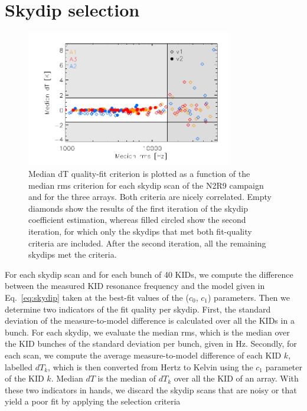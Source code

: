 \section{Skydip selection}%
\label{se:skydip-selection}

\begin{figure}[ht!]
\begin{center}
\includegraphics[clip=true,width=0.8\textwidth]{Figures/Opacity/plot_skydip_selection_two_crit.pdf}
\caption[N2R9 skydip scan selection.]{ Median dT quality-fit criterion is plotted as a function of the median rms criterion for each skydip scan of the N2R9 campaign and for the three arrays. Both criteria are nicely correlated. Empty diamonds show the results of the first iteration of the skydip coefficient estimation, whereas filled circled show the second iteration, for which only the skydips that met both fit-quality criteria are included. After the second iteration, all the remaining skydips met the criteria.}
\label{fig:skydipselection}
\end{center}
\end{figure}

For each skydip scan and for each bunch of 40 KIDs, we compute the
difference between the measured KID resonance frequency and the model
given in Eq.~\ref{eq:skydip} taken at the best-fit values of the
($c_0$, $c_1$) parameters. Then we determine two indicators of the fit
quality per skydip. First, the standard deviation of the
measure-to-model difference is calculated over all the KIDs in a
bunch. For each skydip, we evaluate the median rms, which is the
median over the KID bunches of the standard deviation per bunch, given
in Hz. Secondly, for each scan, we compute the average
measure-to-model difference of each KID $k$, labelled $dT_k$, which is
then converted from Hertz to Kelvin using the $c_1$ parameter of the
KID $k$. Median $dT$ is the median of $dT_k$ over all the KID of an
array. With these two indicators in hands, we discard the skydip scans
that are noisy or that yield a poor fit by applying the selection
criteria

